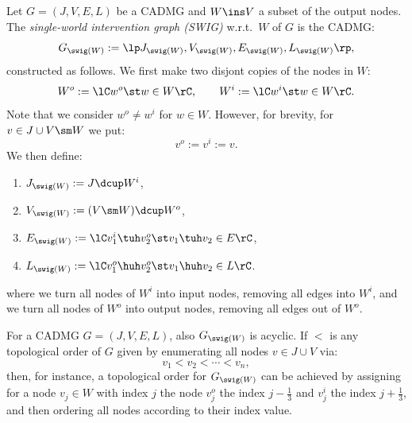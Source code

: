 \begin{Def}
  \label{def:G_node-splitting_intervention}
    Let $G=(J,V,E,L)$ be a CADMG and $W \ins V$ a subset of the output nodes.
    The \emph{single-world intervention graph (SWIG)} w.r.t.\ $W$ of $G$ is the CADMG: 
    \[ G_{\swig(W)} :=\lp J_{\swig(W)}, V_{\swig(W)}, E_{\swig(W)},L_{\swig(W)} \rp,\]
    constructed as follows.
    We first make two disjont copies of the nodes in $W$:
    \[ W^o:=\lC w^o\st w \in W \rC, \qquad W^i:=\lC w^i \st w \in W \rC.  \]
    Note that we consider $w^o \neq w^i$ for $w \in W$.
  However, for brevity, for $v \in J \cup V \sm W$ we put:
  \[ v^o:=v^i:=v.  \]
  We then define:
  \begin{enumerate}[label=\roman*.)]
      \item $J_{\swig(W)} := J \dcup W^i$,
      \item $V_{\swig(W)} := (V \sm W) \dcup W^o$, %
      \item $E_{\swig(W)} := \lC v^i_1 \tuh v_2^o \st v_1 \tuh v_2 \in E  \rC$,
      \item $L_{\swig(W)} :=\lC v_1^o \huh v_2^o \st v_1 \huh v_2 \in L \rC$.
  \end{enumerate}
  where we turn all nodes of $W^i$ into input nodes, removing all edges into $W^i$,
  and we turn all nodes of $W^o$ into output nodes, removing all edges out of $W^o$.
\end{Def}


\begin{Rem}
    For a CADMG $G=(J,V,E,L)$, also $G_{\swig(W)}$ is acyclic.
    If $<$ is any topological order of $G$ given by enumerating all nodes $v \in J \cup V$ via:
    \[ v_1 < v_2 < \cdots < v_n,\]
    then, for instance, 
    a topological order for $G_{\swig(W)}$ can be achieved by assigning for a node $v_j \in W$ with index $j$ the node 
    $v_j^o$ the index $j-\frac{1}{3}$
    and $v_j^i$ the index $j+\frac{1}{3}$, and then ordering all nodes according to their index value.
\end{Rem}

